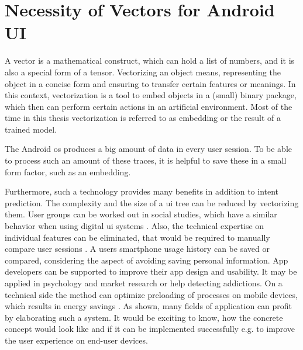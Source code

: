 


\section{Necessity of Vectors for Android UI}
\label{sec:necessity-of-vectors-for-android-ui}

A vector is a mathematical construct, which can hold a list of numbers, and it is also a special form of a tensor.
Vectorizing an object means, representing the object in a concise form and ensuring to transfer certain features or meanings.
In this context, vectorization is a tool to embed objects in a (small) binary package, which then can perform certain actions in an artificial environment.
Most of the time in this thesis vectorization is referred to as embedding or the result of a trained model.

The Android \gls{os} produces a big amount of data in every user session.
To be able to process such an amount of these traces, it is helpful to save these in a small form factor, such as an embedding.


Furthermore, such a technology provides many benefits in addition to intent prediction.
The complexity and the size of a \gls{ui} tree can be reduced by vectorizing them.
User groups can be worked out in social studies, which have a similar behavior when using digital \gls{ui} systems \cite{jayarajah2015need}.
Also, the technical expertise on individual features can be eliminated, that would be required to manually compare user sessions \cite{ghods2019activity2vec}.
A users smartphone usage history can be saved or compared, considering the aspect of avoiding saving personal information.
App developers can be supported to improve their app design and usability.
It may be applied in psychology and market research or help detecting addictions.
On a technical side the method can optimize preloading of processes on mobile devices, which results in energy savings \cite{shen2019deepapp}.
As shown, many fields of application can profit by elaborating such a system.
It would be exciting to know, how the concrete concept would look like and if it can be implemented successfully e.g. to improve the user experience on end-user devices.

